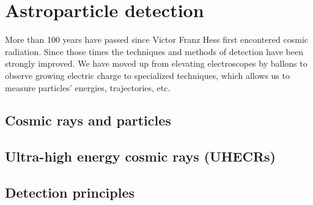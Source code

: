 
\chapter{Astroparticle detection}
More than 100 years have passed since Victor Franz Hess first encontered cosmic radiation. Since those times the techniques and methods of detection have been strongly improved. We have moved up from elevating electroscopes by ballons to observe growing electric charge to specialized techniques, which allows us to measure particles' energies, trajectories, etc.

\section{Cosmic rays and particles}

\section{Ultra-high energy cosmic rays (UHECRs)}
\section{Detection principles}

